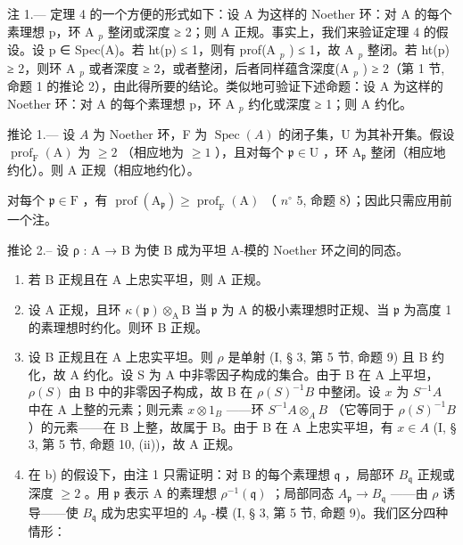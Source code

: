 注 1.--- 定理 4 的一个方便的形式如下：设 A 为这样的 Noether 环：对 A 的每个素理想 p，环 A \(_{p}\) 整闭或深度 ≥ 2；则 A 正规。事实上，我们来验证定理 4 的假设。设 p ∈ Spec(A)。若 ht(p) ≤ 1，则有 prof(A \(_{p}\) ) ≤ 1，故 A \(_{p}\) 整闭。若 ht(p) ≥ 2，则环 A \(_{p}\) 或者深度 ≥ 2，或者整闭，后者同样蕴含深度(A \(_{p}\) ) ≥ 2（第 1 节, 命题 1 的推论 2），由此得所要的结论。类似地可验证下述命题：设 A 为这样的 Noether 环：对 A 的每个素理想 p，环 A \(_{p}\) 约化或深度 ≥ 1；则 A 约化。

推论 1.--- 设 \(A\) 为 Noether 环，F 为 \(\operatorname{Spec}(A)\) 的闭子集，U 为其补开集。假设 \(\operatorname{prof}_{\mathrm{F}}(\mathrm{A})\) 为 \(\geqslant 2\) （相应地为 \(\geqslant 1\) ），且对每个 \(\mathfrak{p} \in \mathrm{U}\) ，环 \(\mathrm{A}_{\mathfrak{p}}\) 整闭（相应地约化）。则 A 正规（相应地约化）。

对每个 \(\mathfrak{p} \in \mathrm{F}\) ，有 \(\operatorname{prof}(\mathrm{A}_{\mathfrak{p}}) \geqslant \operatorname{prof}_{\mathrm{F}}(\mathrm{A})\) （ \(n^{\circ}\) 5, 命题 8）；因此只需应用前一个注。

推论 2.-- 设 ρ : A → B 为使 B 成为平坦 A-模的 Noether 环之间的同态。

\begin{enumerate}
\def\labelenumi{\alph{enumi})}
\item
  若 B 正规且在 A 上忠实平坦，则 A 正规。
\item
  设 A 正规，且环 \(\kappa(\mathfrak{p})\otimes_{\mathrm{A}}\mathrm{B}\) 当 \(\mathfrak{p}\) 为 A 的极小素理想时正规、当 \(\mathfrak{p}\) 为高度 1 的素理想时约化。则环 B 正规。
\item
  设 B 正规且在 A 上忠实平坦。则 \(\rho\) 是单射 (I, § 3, 第 5 节, 命题 9) 且 B 约化，故 A 约化。设 S 为 A 中非零因子构成的集合。由于 B 在 A 上平坦，\(\rho(S)\) 由 B 中的非零因子构成，故 B 在 \(\rho(S)^{-1}B\) 中整闭。设 \(x\) 为 \(S^{-1}A\) 中在 A 上整的元素；则元素 \(x \otimes 1_B\) ——环 \(S^{-1}A \otimes_A B\) （它等同于 \(\rho(S)^{-1}B\) ）的元素——在 B 上整，故属于 B。由于 B 在 A 上忠实平坦，有 \(x \in A\) (I, § 3, 第 5 节, 命题 10, (ii))，故 A 正规。
\item
  在 b) 的假设下，由注 1 只需证明：对 B 的每个素理想 \(\mathfrak{q}\) ，局部环 \(B_{\mathfrak{q}}\) 正规或深度 \(\geqslant 2\) 。用 \(\mathfrak{p}\) 表示 A 的素理想 \(\rho^{-1}(\mathfrak{q})\) ；局部同态 \(A_{\mathfrak{p}} \to B_{\mathfrak{q}}\) ——由 \(\rho\) 诱导——使 \(B_{\mathfrak{q}}\) 成为忠实平坦的 \(A_{\mathfrak{p}}\) -模 (I, § 3, 第 5 节, 命题 9)。我们区分四种情形：
\end{enumerate}


